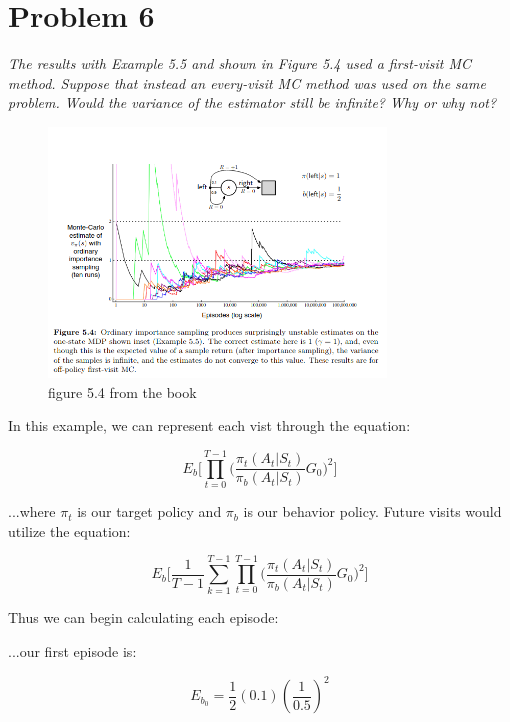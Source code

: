 \documentclass{article}
\begin{document}
\section*{Problem 6}
\textit{The results with Example 5.5 and shown in Figure 5.4 used a first-visit MC method. Suppose that instead an every-visit MC method was used on the same problem. Would the variance of the estimator still be infinite? Why or why not?}

\begin{figure}
    \centering
    \includegraphics[width = 0.8\textwidth]{imgs/figure54.png}
    \caption{figure 5.4 from the book}
    \label{fig:problem6}
\end{figure}

In this example, we can represent each vist through the equation:

\begin{equation}
    E_b \bigg[
        \prod_{t=0}^{T-1} \bigg(\frac{\pi_t(A_t | S_t)}{\pi_b(A_t | S_t)} G_0 \bigg)^2
        \bigg]
\end{equation}

...where $\pi_t$ is our target policy and $\pi_b$ is our behavior policy. Future visits would utilize the equation:

\begin{equation}
    E_b \bigg[
        \frac{1}{T-1}
        \sum_{k=1}^{T-1}
        \prod_{t=0}^{T-1} \bigg(\frac{\pi_t(A_t | S_t)}{\pi_b(A_t | S_t)} G_0 \bigg)^2
        \bigg]
\end{equation}

Thus we can begin calculating each episode:

...our first episode is:

\begin{equation}
    E_{b_0} = \frac{1}{2}(0.1)(\frac{1}{0.5})^2
\end{equation}
\end{document}
